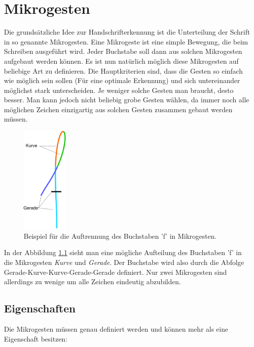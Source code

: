 \chapter{Mikrogesten}

Die grundsätzliche Idee zur Handschrifterkennung ist die Unterteilung der Schrift in so genannte Mikrogesten. Eine Mikrogeste ist eine simple Bewegung, die beim Schreiben ausgeführt wird. Jeder Buchstabe soll dann aus solchen Mikrogesten aufgebaut werden können. 
Es ist nun natürlich möglich diese Mikrogesten auf beliebige Art zu definieren. Die Hauptkriterien sind, dass die Gesten so einfach wie möglich sein sollen (Für eine optimale Erkennung) und sich untereinander möglichst stark unterscheiden. Je weniger solche Gesten man braucht, desto besser. Man kann jedoch nicht beliebig grobe Gesten wählen, da immer noch alle möglichen Zeichen einzigartig aus solchen Gesten zusammen gebaut werden müssen.

\begin{figure}[h!]
  \centering
    \includegraphics[width=0.2\textwidth]{./img/mikrogesten_beispiel.pdf}
  \caption{Beispiel für die Auftrennung des Buchstaben 'f' in Mikrogesten.}
  \label{mikrogeste_beispiel}
\end{figure}

In der Abbildung \ref{mikrogeste_beispiel} sieht man eine mögliche Aufteilung des Buchstaben 'f' in die Mikrogesten \emph{Kurve} und \emph{Gerade}. Der Buchstabe wird also durch die Abfolge Gerade-Kurve-Kurve-Gerade-Gerade definiert. Nur zwei Mikrogesten sind allerdings zu wenige um alle Zeichen eindeutig abzubilden.

\section{Eigenschaften}
Die Mikrogesten müssen genau definiert werden und können mehr als eine Eigenschaft besitzen:

